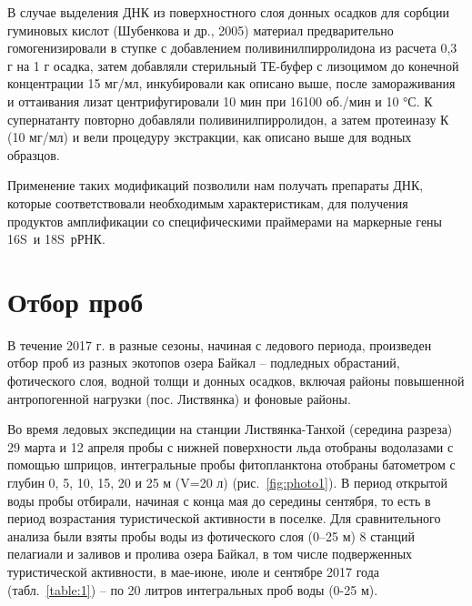\documentclass[a4paper,12pt,openany,final]{extreport}
\begin{document}
В случае выделения ДНК из поверхностного слоя донных осадков для сорбции
гуминовых кислот (Шубенкова и др., 2005) материал предварительно
гомогенизировали в ступке с добавлением поливинилпирролидона из расчета
0,3 г на 1 г осадка, затем добавляли стерильный ТЕ-буфер с лизоцимом до
конечной концентрации 15 мг/мл, инкубировали как описано выше, после
замораживания и оттаивания лизат центрифугировали 10 мин при 16100
об./мин и 10 °С. К супернатанту повторно добавляли поливинилпирролидон,
а затем протеиназу К (10 мг/мл) и вели процедуру экстракции, как описано
выше для водных образцов.

Применение таких модификаций позволили нам получать препараты ДНК,
которые соответствовали необходимым характеристикам, для получения
продуктов амплификации со специфическими праймерами на маркерные гены
16S~и 18S~рРНК.

\section{Отбор проб }

В течение 2017 г. в разные сезоны, начиная с ледового периода,
произведен отбор проб из разных экотопов озера Байкал -- подледных
обрастаний, фотического слоя, водной толщи и донных осадков, включая
районы повышенной антропогенной нагрузки (пос. Листвянка) и фоновые
районы.

Во время ледовых экспедиции на станции Листвянка-Танхой (середина
разреза) 29 марта и 12 апреля пробы с нижней поверхности льда отобраны
водолазами с помощью шприцов, интегральные пробы фитопланктона отобраны
батометром с глубин 0, 5, 10, 15, 20 и 25 м (V=20 л) (рис.~\ref{fig:photo1}). В период
открытой воды пробы отбирали, начиная с конца мая до середины сентября,
то есть в период возрастания туристической активности в поселке. Для
сравнительного анализа были взяты пробы воды из фотического слоя (0--25
м) 8 станций пелагиали и заливов и пролива озера Байкал, в том числе
подверженных туристической активности, в мае-июне, июле и сентябре 2017
года (табл.~\ref{table:1}) -- по 20 литров интегральных проб воды (0-25 м).
\end{document}
